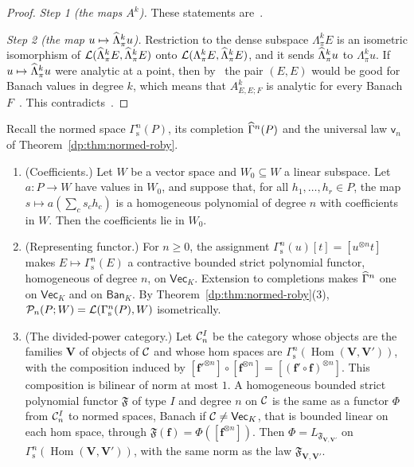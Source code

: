 \begin{proof}
\emph{Step 1 (the maps $A^k$).} These statements are~\cite[Theorem~7.2]{I}.

\emph{Step 2 (the map $u\mapsto\widehat\Lambda^k_\pi u$).} Restriction to the dense subspace $\Lambda^k_\pi E$ is an isometric isomorphism of $\mathcal L(\widehat\Lambda^k_\pi E,\widehat\Lambda^k_\pi E)$ onto $\mathcal L(\Lambda^k_\pi E,\widehat\Lambda^k_\pi E)$, and it sends $\widehat\Lambda^k_\pi u$ to $\Lambda^k_\pi u$. If $u\mapsto\widehat\Lambda^k_\pi u$ were analytic at a point, then by~\cite[Lemma~3.4]{I} the pair $(E,E)$ would be good for Banach values in degree $k$, which means that $A^k_{E,E;F}$ is analytic for every Banach $F$~\cite[Definition~3.3]{I}. This contradicts~\cite[Theorem~7.2(1)]{I}.
\end{proof}

Recall the normed space $\Gamma^n_{\mathrm s}(P)$, its completion $\widehat\Gamma^n(P)$ and the universal law $\mathsf v_n$ of Theorem~\ref{dp:thm:normed-roby}.

\begin{lemma}\label{dp:lem:functor-rep}
\leavevmode
\begin{enumerate}
\item \textup{(Coefficients.)} Let $W$ be a vector space and $W_0\subseteq W$ a linear subspace. Let $a\colon P\to W$ have values in $W_0$, and suppose that, for all $h_1,\dots,h_r\in P$, the map $s\mapsto a(\sum_cs_ch_c)$ is a homogeneous polynomial of degree $n$ with coefficients in $W$. Then the coefficients lie in $W_0$.
\item \textup{(Representing functor.)} For $n\ge0$, the assignment $\Gamma^n_{\mathrm s}(u)[t]=[u^{\otimes n}t]$ makes $E\mapsto\Gamma^n_{\mathrm s}(E)$ a contractive bounded strict polynomial functor, homogeneous of degree $n$, on $\mathsf{Vec}_K$. Extension to completions makes $\widehat\Gamma^n$ one on $\mathsf{Vec}_K$ and on $\mathsf{Ban}_K$. By Theorem~\ref{dp:thm:normed-roby}(3), $\mathcal P_n(P;W)=\mathcal L(\Gamma^n_{\mathrm s}(P),W)$ isometrically.
\item \textup{(The divided-power category.)} Let $\mathcal{C}^I_n$ be the category whose objects are the families $\mathbf V$ of objects of $\mathcal{C}$ and whose hom spaces are $\Gamma^n_{\mathrm s}(\operatorname{Hom}(\mathbf V,\mathbf V'))$, with the composition induced by $[\mathbf f'^{\otimes n}]\circ[\mathbf f^{\otimes n}]=[(\mathbf f'\circ\mathbf f)^{\otimes n}]$. This composition is bilinear of norm at most $1$. A homogeneous bounded strict polynomial functor $\mathfrak F$ of type $I$ and degree $n$ on $\mathcal{C}$ is the same as a functor $\Phi$ from $\mathcal{C}^I_n$ to normed spaces, Banach if $\mathcal{C}\ne\mathsf{Vec}_K$, that is bounded linear on each hom space, through $\mathfrak F(\mathbf f)=\Phi([\mathbf f^{\otimes n}])$. Then $\Phi=L_{\mathfrak F_{\mathbf V,\mathbf V'}}$ on $\Gamma^n_{\mathrm s}(\operatorname{Hom}(\mathbf V,\mathbf V'))$, with the same norm as the law $\mathfrak F_{\mathbf V,\mathbf V'}$.
\end{enumerate}
\end{lemma}

